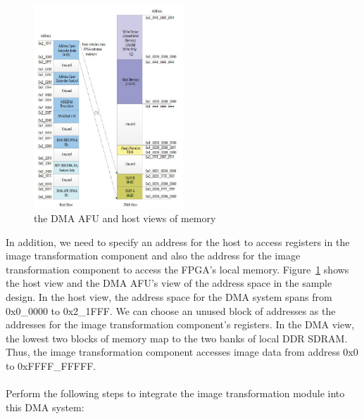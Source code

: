 \documentclass[epsfig,10pt,fullpage]{article}
\begin{document}
\begin{figure}[h]
    \centering
    \includegraphics[width=0.5\textwidth]{figures/memoryView.JPG}
    \caption{the DMA AFU and host views of memory}
    \label{fig:memView}
\end{figure}

\noindent
In addition, we need to specify an address for the host to access registers in the image transformation component and also the address for the image transformation component to access the FPGA's local memory. Figure~\ref{fig:memView} shows the host view and the DMA AFU's view of the address space in the sample design. In the host view, the address space for the DMA system spans from 0x0\_0000 to 0x2\_1FFF. We can choose an unused block of addresses as the addresses for the image transformation component's registers. In the DMA view, the lowest two blocks of memory map to the two banks of local DDR SDRAM. Thus, the image transformation component accesses image data from address 0x0 to 0xFFFF\_FFFFF.\\
\\


\noindent
Perform the following steps to integrate the image transformation module into this DMA system:
\end{document}
